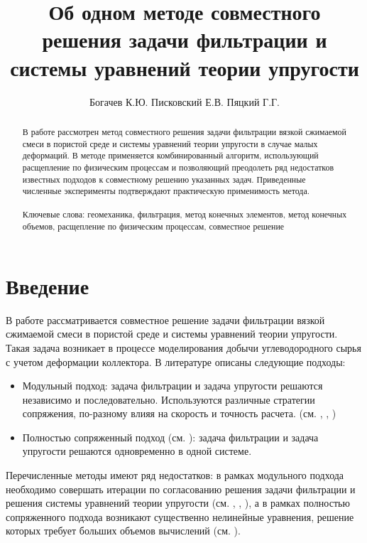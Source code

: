 \documentclass[11pt,twoside]{article}
\title{Об одном методе совместного решения задачи фильтрации и системы уравнений теории упругости}
\author{ Богачев К.Ю. Писковский Е.В. Пяцкий Г.Г.  }
\begin{document}
 
\maketitle
\begin{abstract}
  
 В работе рассмотрен метод совместного решения задачи фильтрации вязкой сжимаемой смеси в пористой среде и системы уравнений теории упругости в случае малых деформаций. В методе применяется комбинированный алгоритм, использующий расщепление по физическим процессам и позволяющий преодолеть ряд недостатков известных подходов к совместному решению указанных задач. Приведенные численные эксперименты подтверждают практическую применимость метода.\\ \\
  Ключевые слова: геомеханика, фильтрация, метод конечных элементов, метод конечных объемов, расщепление по физическим процессам, совместное решение
\end{abstract}

\section{Введение}

В работе рассматривается совместное решение задачи фильтрации вязкой сжимаемой смеси в пористой среде и системы уравнений теории упругости. Такая задача возникает в процессе моделирования добычи углеводородного сырья с учетом деформации коллектора. В литературе описаны следующие подходы:

\begin{itemize}
\setlength\itemsep{0 em}
\item Модульный подход: задача фильтрации и задача упругости решаются независимо и последовательно. Используются различные стратегии сопряжения, по-разному влияя на скорость и точность расчета. (см. \cite{oneway}, \cite{iterative}, \cite{SPE2015})
\item Полностью сопряженный подход (см. \cite{fully}): задача фильтрации и задача упругости решаются одновременно в одной системе. 
\end{itemize}

Перечисленные методы имеют ряд недостатков: в рамках модульного подхода необходимо совершать итерации по согласованию решения задачи фильтрации и решения системы уравнений теории упругости (см. \cite{oneway}, \cite{iterative}, \cite{SPE2015}),
а в рамках полностью сопряженного подхода возникают существенно нелинейные уравнения, решение которых требует больших объемов вычислений (см. \cite{fully}).
\end{document}
